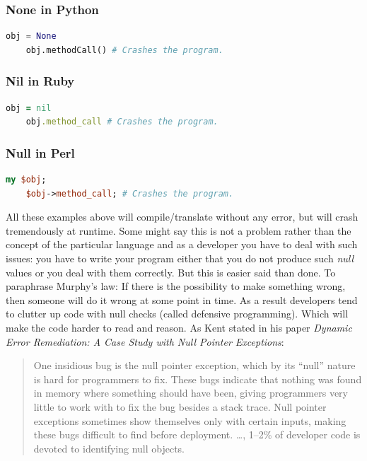 \documentclass[11pt, a4paper]{report}
\begin{document}
\subsubsection{None in Python}
\begin{lstlisting}[language=Python]
    obj = None
    obj.methodCall() # Crashes the program.
\end{lstlisting}

\subsubsection{Nil in Ruby}
\begin{lstlisting}[language=Ruby]
    obj = nil
    obj.method_call # Crashes the program.
\end{lstlisting}

\subsubsection{Null in Perl}
\begin{lstlisting}[language=Perl]
    my $obj;
    $obj->method_call; # Crashes the program.
\end{lstlisting}

All these examples above will compile/translate without any error, but will crash tremendously at runtime. Some might say this is not a problem rather than the concept of the particular language and as a developer you have to deal with such issues: you have to write your program either that you do not produce such \textit{null} values or you deal with them correctly. But this is easier said than done. To paraphrase Murphy's law\cite{murphys-law}: If there is the possibility to make something wrong, then someone will do it wrong at some point in time. As a result developers tend to clutter up code with null checks (called defensive programming). Which will make the code harder to read and reason. As Kent\cite{kent-dyn-err-remediation} stated in his paper \textit{Dynamic Error Remediation: A Case Study with Null Pointer Exceptions}:

\begin{quotation}
    One insidious bug is the null pointer exception, which by its ``null'' nature is hard for programmers to fix. These bugs indicate that nothing was found in memory where something should have been, giving programmers very little to work with to fix the bug besides a stack trace. Null pointer exceptions sometimes show themselves only with certain inputs, making these bugs difficult to find before deployment. \ldots, 1--2\% of developer code is devoted to identifying null objects.
\end{quotation}
\end{document}
